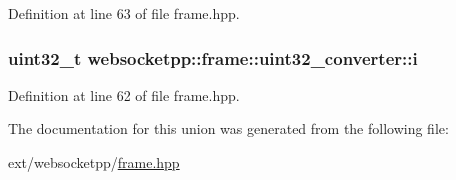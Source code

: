 Definition at line 63 of file frame.\+hpp.

\hypertarget{unionwebsocketpp_1_1frame_1_1uint32__converter_a2bceb785be148d7c9b9ce11240595440}{}
\subsubsection[{i}]{\setlength{\rightskip}{0pt plus 5cm}uint32\+\_\+t websocketpp\+::frame\+::uint32\+\_\+converter\+::i}\label{unionwebsocketpp_1_1frame_1_1uint32__converter_a2bceb785be148d7c9b9ce11240595440}


Definition at line 62 of file frame.\+hpp.



The documentation for this union was generated from the following file\+:\begin{DoxyCompactItemize}
\item 
ext/websocketpp/\hyperlink{frame_8hpp}{frame.\+hpp}\end{DoxyCompactItemize}
